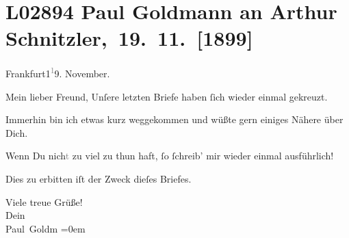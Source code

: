 

\section[ Paul Goldmann an Arthur Schnitzler, 19. 11. {[}1899{]}]{L02894 Paul Goldmann an Arthur Schnitzler, 19. 11. {[}1899{]}}
\nopagebreak{}
\rehead{ }\normalsize\beginnumbering{}
\toendnotes[C]{\smallbreak\pagebreak[2]}
\pstart
           \centering{}{\pb}Frankfurt1\substVorne{}\textsuperscript{\textcolor{gray}{1}}\substDazwischen{}9\substHinten{}. November.\pend
           
\pstart\center{}Mein lieber Freund,\pend\vspace{0.5em}
\pstart
           Unſer\strikeout{\textcolor{gray}{l}}e letzten Briefe haben ſich wieder einmal gekreuzt.\pend
           
\pstart
           Immerhin bin ich etwas kurz weggekommen und wüßte gern einiges Nähere über Dich.\pend
           
\pstart
           Wenn Du nich\textcolor{gray}{t}{ }\strikeout{\textcolor{gray}{D}} zu viel zu thun haft, ſo ſchreib’ mir wieder einmal ausführlich!\pend
           
\pstart
           Dies zu erbitten iſt der Zweck dieſes Briefes.\pend
           
\pstart
           Viele treue Grüße! {\\[\baselineskip]}Dein {\\[\baselineskip]}\spacefill\mbox{Paul Goldm}\pend
           \leftskip=0em{}\endnumbering{}  
      